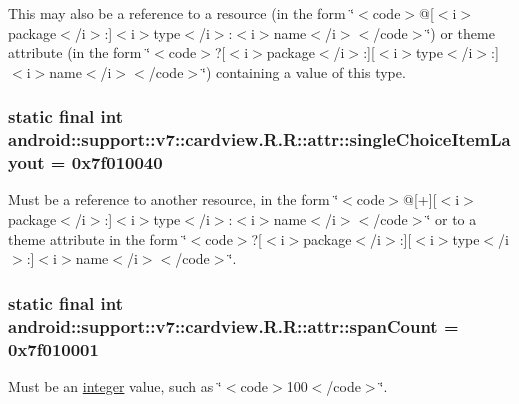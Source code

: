 This may also be a reference to a resource (in the form \char`\"{}$<$code$>$@\mbox{[}$<$i$>$package$<$/i$>$:\mbox{]}$<$i$>$type$<$/i$>$:$<$i$>$name$<$/i$>$$<$/code$>$\char`\"{}) or theme attribute (in the form \char`\"{}$<$code$>$?\mbox{[}$<$i$>$package$<$/i$>$:\mbox{]}\mbox{[}$<$i$>$type$<$/i$>$:\mbox{]}$<$i$>$name$<$/i$>$$<$/code$>$\char`\"{}) containing a value of this type. \hypertarget{classandroid_1_1support_1_1v7_1_1cardview_1_1_r_1_1attr_b1346019f1dd737c40ca5cca68e949af}{
\subsubsection[{singleChoiceItemLayout}]{\setlength{\rightskip}{0pt plus 5cm}static final int android::support::v7::cardview.R.R::attr::singleChoiceItemLayout = 0x7f010040}}
\label{classandroid_1_1support_1_1v7_1_1cardview_1_1_r_1_1attr_b1346019f1dd737c40ca5cca68e949af}


Must be a reference to another resource, in the form \char`\"{}$<$code$>$@\mbox{[}+\mbox{]}\mbox{[}$<$i$>$package$<$/i$>$:\mbox{]}$<$i$>$type$<$/i$>$:$<$i$>$name$<$/i$>$$<$/code$>$\char`\"{} or to a theme attribute in the form \char`\"{}$<$code$>$?\mbox{[}$<$i$>$package$<$/i$>$:\mbox{]}\mbox{[}$<$i$>$type$<$/i$>$:\mbox{]}$<$i$>$name$<$/i$>$$<$/code$>$\char`\"{}. \hypertarget{classandroid_1_1support_1_1v7_1_1cardview_1_1_r_1_1attr_5fb3939fb90be27c14bdc40a6f78e1dd}{
\subsubsection[{spanCount}]{\setlength{\rightskip}{0pt plus 5cm}static final int android::support::v7::cardview.R.R::attr::spanCount = 0x7f010001}}
\label{classandroid_1_1support_1_1v7_1_1cardview_1_1_r_1_1attr_5fb3939fb90be27c14bdc40a6f78e1dd}


Must be an \hyperlink{classandroid_1_1support_1_1v7_1_1cardview_1_1_r_1_1integer}{integer} value, such as \char`\"{}$<$code$>$100$<$/code$>$\char`\"{}. 

